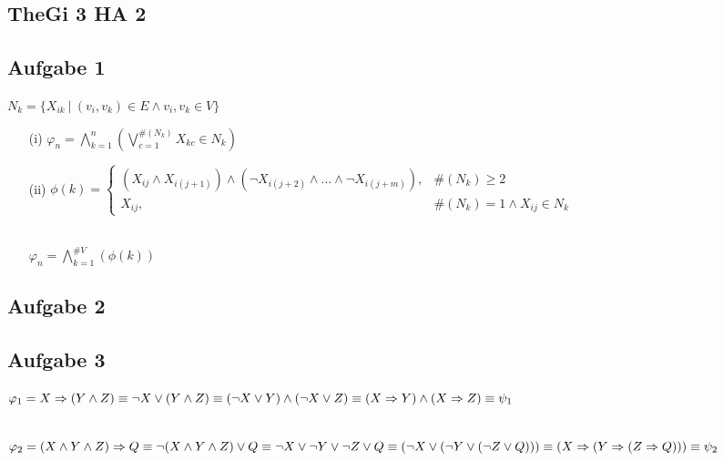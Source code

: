 \documentclass{article}
\begin{document}
	\begin{Large}
	\section*{TheGi 3 HA 2}	
	\subsection*{Aufgabe 1}

	\( N_k = \{X_{ik}~|~(v_i,v_k) \in E \wedge v_i,v_k \in V \} \)
	
	\begin{enumerate}
	\item[(i)]	
	\( \varphi_n = \bigwedge\limits_{k = 1}^{n} (\bigvee\limits_{c = 1}^{\#(N_k)} X_{kc} \in  N_k) \)

	\item[(ii)]
	\( \phi(k) = \begin{cases}	
	(X_{ij} \wedge X_{i(j+1)}) \wedge (\neg X_{i(j+2)} \wedge ... \wedge \neg X_{i(j+m)}), & \#(N_k) \geq 2\\
	X_{ij}, & \#(N_k) = 1 \wedge X_{ij} \in N_k 	
	\end{cases} \)
	
	\ \\ \( \varphi_n = \bigwedge\limits_{k = 1}^{\#V} (\phi(k))
	\)
	
	\end{enumerate}
	
	\subsection*{Aufgabe 2}	
	
	\subsection*{Aufgabe 3}
	
	\( \varphi_1 = X \Rightarrow (Y \wedge Z) \\
	\equiv \neg X \vee (Y \wedge Z) \\
	\equiv (\neg X \vee Y) \wedge (\neg X \vee Z) \\
	\equiv (X \Rightarrow Y) \wedge (X \Rightarrow Z) \\
	\equiv \psi_1 \\
	\) 
	
	\ \\ \( \varphi_2 = (X \wedge Y \wedge Z) \Rightarrow Q \\
	\equiv \neg (X \wedge Y \wedge Z) \vee Q \\
	\equiv \neg X \vee \neg Y \vee \neg Z \vee Q \\
	\equiv (\neg X \vee (\neg Y \vee (\neg Z \vee Q))) \\
	\equiv (X \Rightarrow (Y \Rightarrow (Z \Rightarrow Q))) \\
	\equiv \psi_2 \\
	\) 
	

\end{Large}
\end{document}
